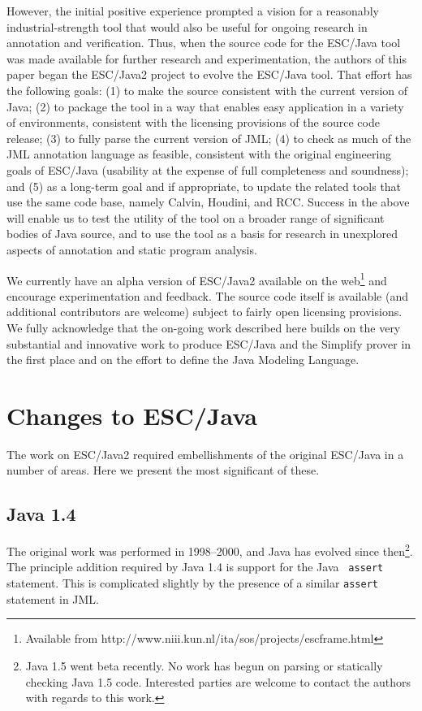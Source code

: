 \documentclass{acm_proc_article-sp}
\begin{document}
However, the initial positive experience prompted a vision for a
reasonably industrial-strength tool that would also be useful for
ongoing research in annotation and verification.  Thus, when the
source code for the ESC/Java tool was made available for further
research and experimentation, the authors of this paper began the
ESC/Java2 project to evolve the ESC/Java tool.  That effort has the
following goals:
(1) to make the source consistent with the current version of Java;
(2) to package the tool in a way that enables easy application in a
  variety of environments, consistent with the licensing provisions of
  the source code release;
(3) to fully parse the current version of JML;
(4) to check as much of the JML annotation language as feasible,
  consistent with the original engineering goals of ESC/Java
  (usability at the expense of full completeness and soundness);
and (5) as a long-term goal and if appropriate, to update the related
  tools that use the same code base, namely Calvin, Houdini, and RCC.
Success in the above will enable us to
 test the utility of the tool on a broader range of significant
  bodies of Java source, and
to use the tool as a basis for research in unexplored aspects of
  annotation and static program analysis.

We currently have an alpha version of ESC/Java2 available on the
web\footnote{Available from 
{http://www.niii.kun.nl/ita/sos/projects/escframe.html}}
and encourage experimentation and feedback.  The source code itself is
available (and additional contributors are welcome) subject to fairly
open licensing provisions.  We fully acknowledge that the on-going
work described here builds on the very substantial and innovative work
to produce ESC/Java and the Simplify prover in the first place and on
the effort to define the Java Modeling Language.

\section{Changes to ESC/Java}

The work on ESC/Java2 required embellishments of the original ESC/Java
in a number of areas.  Here we present the most significant of these.
\subsection{Java 1.4}
The original work was performed in 1998--2000, and Java has evolved
since then\footnote{Java 1.5 went beta recently.  No work has begun on
  parsing or statically checking Java 1.5 code.  Interested parties
  are welcome to contact the authors with regards to this work.}.  The
principle addition required by Java 1.4 is support for the Java {\tt
  assert} statement.  This is complicated slightly by the presence of
a similar \texttt{assert} statement in JML.
\end{document}
